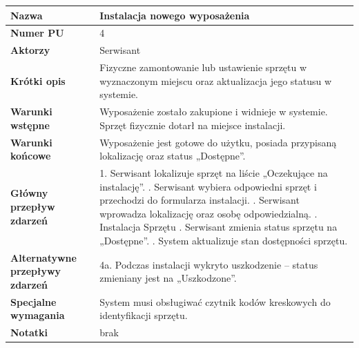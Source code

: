 \documentclass{article}
\begin{document}
    \begin{tabular}{|m{10em}|m{30em}|}
        \hline
        \textbf{Nazwa} & Instalacja nowego wyposażenia \\
        \hline
        \textbf{Numer PU} & 4 \\
        \hline
        \textbf{Aktorzy} & Serwisant \\
        \hline
        \textbf{Krótki opis} & Fizyczne zamontowanie lub ustawienie sprzętu w wyznaczonym miejscu oraz aktualizacja jego statusu w systemie. \\
        \hline
        \textbf{Warunki wstępne} & Wyposażenie zostało zakupione i widnieje w systemie. Sprzęt fizycznie dotarł na miejsce instalacji. \\
        \hline
        \textbf{Warunki końcowe} & Wyposażenie jest gotowe do użytku, posiada przypisaną lokalizację oraz status „Dostępne”. \\
        \hline
        \textbf{Główny przepływ zdarzeń} & 
            1. Serwisant lokalizuje sprzęt na liście „Oczekujące na instalację”. \newline
            2. Serwisant wybiera odpowiedni sprzęt i przechodzi do formularza instalacji. \newline
            3. Serwisant wprowadza lokalizację oraz osobę odpowiedzialną. \newline
            4. Instalacja Sprzętu \newline
            5. Serwisant zmienia status sprzętu na „Dostępne”. \newline
            6. System aktualizuje stan dostępności sprzętu. \\
        \hline
        \textbf{Alternatywne przepływy zdarzeń} & 
            4a. Podczas instalacji wykryto uszkodzenie – status zmieniany jest na „Uszkodzone”. \\
        \hline
        \textbf{Specjalne wymagania} & System musi obsługiwać czytnik kodów kreskowych do identyfikacji sprzętu. \\
        \hline
        \textbf{Notatki} & brak \\
        \hline
    \end{tabular}

    \vspace{1cm}
\end{document}
